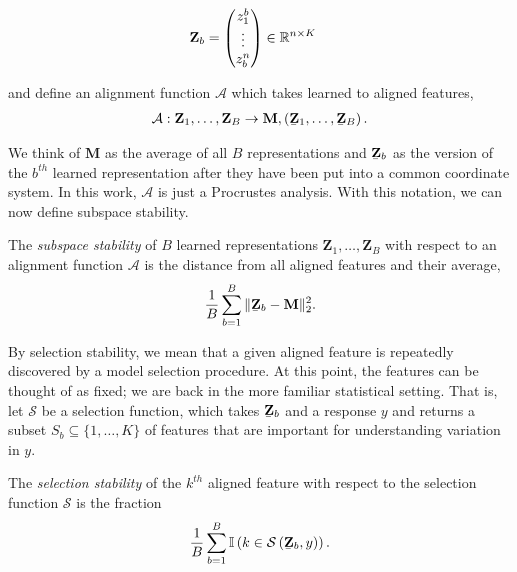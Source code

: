 \begin{align}
\mathbf{Z}_{b} &= \begin{pmatrix}
z^{b}_{1} \\
\vdots \\
z_{b}^{n}
\end{pmatrix} \in \mathbb{R}^{n \times K}
\end{align}

and define an alignment function $\mathcal{A}$ which takes learned to aligned features,
\begin{align*}
\mathcal{A}: \mathbf{Z}_{1}, \dots, \mathbf{Z}_{B} \to \mathbf{M}, \left(\underaccent{\bar}{\mathbf{Z}}_{1}, \dots, \underaccent{\bar}{\mathbf{Z}}_{B}\right).
\end{align*}

We think of $\mathbf{M}$ as the average of all $B$ representations and $\underaccent{\bar}{\mathbf{Z}}_{b}$ as the version of the $b^{th}$ learned representation after they have been put into a common coordinate system. In this work, $\mathcal{A}$ is just a Procrustes analysis. With this notation, we can now define subspace stability.

\begin{definition}
The \textit{subspace stability} of $B$ learned representations $\mathbf{Z}_{1}, \dots, \mathbf{Z}_{B}$ with respect to an alignment function $\mathcal{A}$ is the distance from all aligned features and their average,
\begin{align*}
\frac{1}{B} \sum_{b = 1}^{B} \|\underaccent{\bar}{\mathbf{Z}}_{b} - \mathbf{M}\|^{2}_{2}.
\end{align*}
\end{definition}

By selection stability, we mean that a given aligned feature is repeatedly
discovered by a model selection procedure. At this point, the features can be
thought of as fixed; we are back in the more familiar statistical setting. That
is, let $\mathcal{S}$ be a selection function, which takes
$\underaccent{\bar}{\mathbf{Z}}_{b}$ and a response $y$ and returns a subset
$S_{b} \subseteq \{1, \dots, K\}$ of features that are important for
understanding variation in $y$.

\begin{definition}
The \textit{selection stability} of the $k^{th}$ aligned feature with respect to the selection function $\mathcal{S}$ is the fraction
\begin{align*}
\frac{1}{B}\sum_{b = 1}^{B} \indic{k \in \mathcal{S}\left(\underaccent{\bar}{\mathbf{Z}}_{b}, y\right)}.
\end{align*}
\end{definition}
